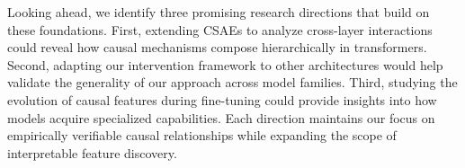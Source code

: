 \documentclass{article} %
\begin{document}
Looking ahead, we identify three promising research directions that build on these foundations. First, extending CSAEs to analyze cross-layer interactions could reveal how causal mechanisms compose hierarchically in transformers. Second, adapting our intervention framework to other architectures would help validate the generality of our approach across model families. Third, studying the evolution of causal features during fine-tuning could provide insights into how models acquire specialized capabilities. Each direction maintains our focus on empirically verifiable causal relationships while expanding the scope of interpretable feature discovery.



\end{document}
